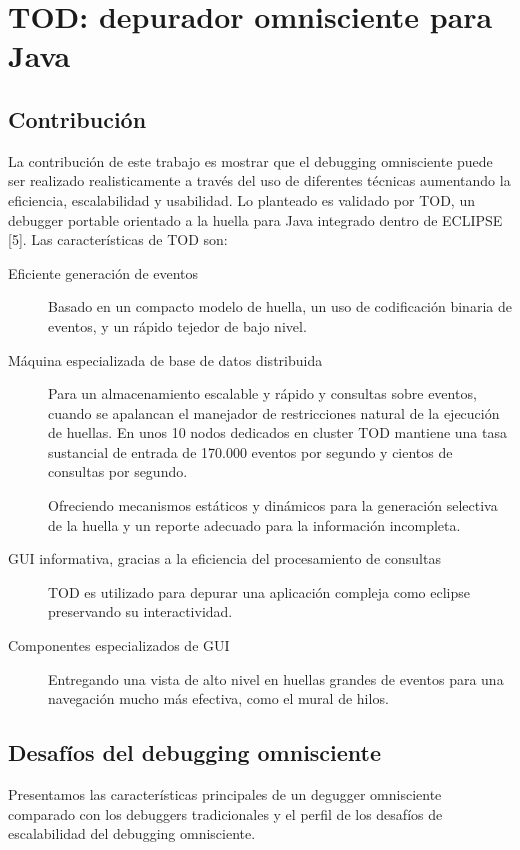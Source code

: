 \documentclass[12pt,a4paper]{report}
\begin{document}
	\section{TOD: depurador omnisciente para Java}
		\subsection{Contribución}

La contribución de este trabajo es mostrar que el debugging omnisciente puede ser realizado realisticamente a través del uso de diferentes técnicas aumentando la eficiencia, escalabilidad y usabilidad.  Lo planteado es validado por TOD, un debugger portable orientado a la huella para Java integrado dentro de ECLIPSE [5].  Las características de TOD son:
\begin{description}
	\item[Eficiente generación de eventos] Basado en un compacto modelo de huella, un uso de codificación binaria de eventos, y un rápido tejedor de bajo nivel.

	\item[Máquina especializada de base de datos distribuida] Para un almacenamiento escalable y rápido y consultas sobre eventos, cuando se apalancan el manejador de restricciones natural de la ejecución de huellas.  En unos 10 nodos dedicados en cluster TOD mantiene una tasa sustancial de entrada de 170.000 eventos por segundo y cientos de consultas por segundo.

	 Ofreciendo mecanismos estáticos y dinámicos para la generación selectiva de la huella y un reporte adecuado para la información incompleta.

	\item[GUI informativa, gracias a la eficiencia del procesamiento de consultas] TOD es utilizado para depurar una aplicación compleja como eclipse preservando su interactividad.

	\item[Componentes especializados de GUI] Entregando una vista de alto nivel en huellas grandes de eventos para una navegación mucho más efectiva, como el mural de hilos.
\end{description}


		\subsection[Desafíos]{Desafíos del debugging omnisciente}

	Presentamos las características principales de un degugger omnisciente comparado con los debuggers tradicionales y el perfil de los desafíos de escalabilidad del debugging omnisciente.
\end{document}
